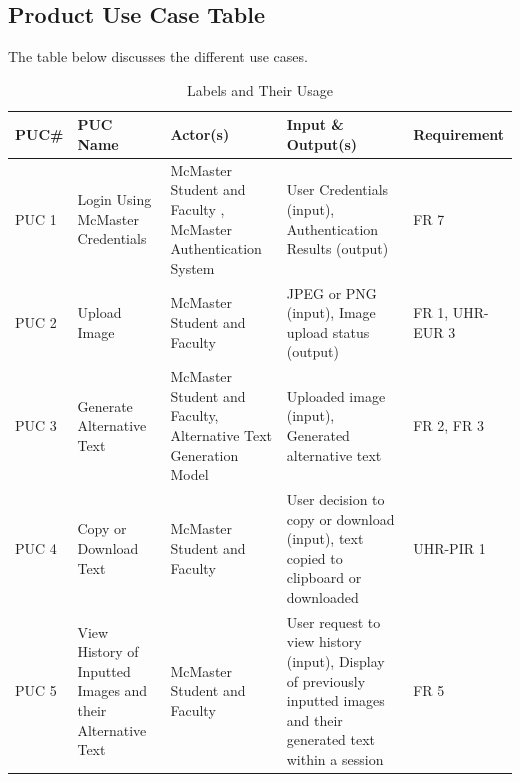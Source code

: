 \documentclass[12pt]{article}
\begin{document}
\subsection{Product Use Case Table}
The table below discusses the different use cases. 
    \begin{table}[H]
      \centering
      \caption{Labels and Their Usage}
      \begin{tabular}{|p{1.3cm}|p{3.5cm}|p{3.5cm}|p{4cm}|p{2.8cm}|}
      \hline
      \textbf{PUC\#} & \textbf{PUC Name} & \textbf{Actor(s)} & \textbf{Input \& Output(s)} & \textbf{Requirement} \\ 
      \hline 
      PUC 1 & Login Using McMaster Credentials &  McMaster Student and Faculty , McMaster Authentication System & User Credentials (input), Authentication Results (output) & FR 7 \\
      \hline 
      PUC 2 & Upload Image & McMaster Student and Faculty & JPEG or PNG (input), Image upload status (output) & FR 1, UHR-EUR 3 \\
      \hline 
      PUC 3 & Generate Alternative Text &  McMaster Student and Faculty, Alternative Text Generation Model & Uploaded image (input), Generated alternative text  & FR 2, FR 3\\
      \hline
      PUC 4 & Copy or Download Text & McMaster Student and Faculty & User decision to copy or download (input), text copied to clipboard or downloaded & UHR-PIR 1\\ 
      \hline
      PUC 5 & View History of Inputted Images and their Alternative Text & McMaster Student and Faculty & User request to view history (input), Display of previously inputted images and their generated text within a session & FR 5\\
      \hline
\end{tabular}
\end{table}
\end{document}

